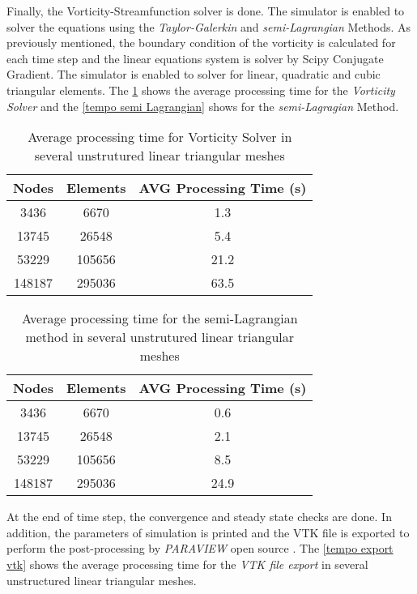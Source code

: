\medskip
Finally, the Vorticity-Streamfunction solver is done. 
The simulator is enabled to solver the equations using the
\textit{Taylor-Galerkin} and \textit{semi-Lagrangian} Methods.
As previously mentioned, the boundary condition of the vorticity
is calculated for each time step and 
the linear equations system is solver by Scipy Conjugate Gradient.
The simulator is enabled to solver for linear, quadratic and cubic
triangular elements. The \ref{tempo vorticity solver} 
shows the average processing time for the \textit{Vorticity Solver}
and the \ref{tempo semi Lagrangian} 
shows for the \textit{semi-Lagragian} Method.

\vspace{0.5cm}
\begin{table}[H]
\centering
\begin{tabular}{ccc}
\toprule
\textbf{Nodes} & \textbf{Elements} & \textbf{AVG Processing Time} (s) \\
\midrule
3436 & 6670 & 1.3 \\
13745 & 26548 & 5.4 \\
53229 & 105656 & 21.2 \\
148187 & 295036 & 63.5 \\



\bottomrule
\end{tabular}
\caption{Average processing time for Vorticity Solver in several unstrutured linear triangular meshes}
\label{tempo vorticity solver}
\end{table}


\vspace{0.5cm}
\begin{table}[H]
\centering
\begin{tabular}{ccc}
\toprule
\textbf{Nodes} & \textbf{Elements} & \textbf{AVG Processing Time} (s) \\
\midrule
3436 & 6670 & 0.6 \\
13745 & 26548 & 2.1 \\
53229 & 105656 & 8.5 \\
148187 & 295036 & 24.9 \\



\bottomrule
\end{tabular}
\caption{Average processing time for the semi-Lagrangian method in several unstrutured linear triangular meshes}
\label{tempo semi lagrangian}
\end{table}


\medskip
At the end of time step, the convergence and steady state checks are done.
In addition, the parameters of simulation is printed and
the VTK file is exported to perform the post-processing by
\textit{PARAVIEW} open source \cite{paraview}. 
The \ref{tempo export vtk} 
shows the average processing time for the \textit{VTK file export}
in several unstructured linear triangular meshes.

